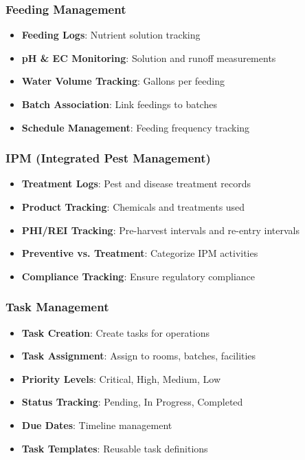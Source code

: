 \documentclass[11pt,a4paper]{article}
\begin{document}
\subsubsection{Feeding Management}
\begin{itemize}
    \item \textbf{Feeding Logs}: Nutrient solution tracking
    \item \textbf{pH \& EC Monitoring}: Solution and runoff measurements
    \item \textbf{Water Volume Tracking}: Gallons per feeding
    \item \textbf{Batch Association}: Link feedings to batches
    \item \textbf{Schedule Management}: Feeding frequency tracking
\end{itemize}

\subsubsection{IPM (Integrated Pest Management)}
\begin{itemize}
    \item \textbf{Treatment Logs}: Pest and disease treatment records
    \item \textbf{Product Tracking}: Chemicals and treatments used
    \item \textbf{PHI/REI Tracking}: Pre-harvest intervals and re-entry intervals
    \item \textbf{Preventive vs. Treatment}: Categorize IPM activities
    \item \textbf{Compliance Tracking}: Ensure regulatory compliance
\end{itemize}

\subsubsection{Task Management}
\begin{itemize}
    \item \textbf{Task Creation}: Create tasks for operations
    \item \textbf{Task Assignment}: Assign to rooms, batches, facilities
    \item \textbf{Priority Levels}: Critical, High, Medium, Low
    \item \textbf{Status Tracking}: Pending, In Progress, Completed
    \item \textbf{Due Dates}: Timeline management
    \item \textbf{Task Templates}: Reusable task definitions
\end{itemize}
\end{document}
